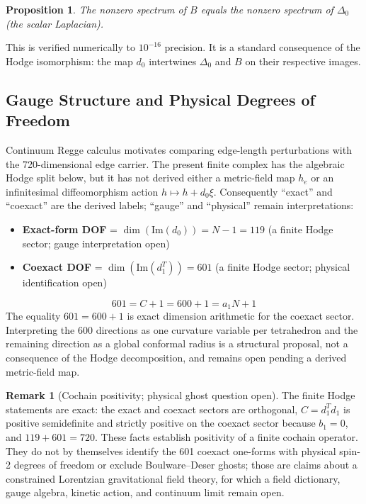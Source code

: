 \documentclass[12pt,a4paper]{article}
\newtheorem{proposition}{Proposition}
\theoremstyle{definition}
\newtheorem{remark}{Remark}
\begin{document}
\begin{proposition}
The nonzero spectrum of $B$ equals the nonzero spectrum of $\Delta_0$ (the scalar Laplacian).
\end{proposition}

This is verified numerically to $10^{-16}$ precision. It is a standard consequence of the Hodge isomorphism: the map $d_0$ intertwines $\Delta_0$ and $B$ on their respective images.

\subsection{Gauge Structure and Physical Degrees of Freedom}

Continuum Regge calculus motivates comparing edge-length perturbations with the 720-dimensional edge carrier.  The present finite complex has the algebraic Hodge split below, but it has not derived either a metric-field map $h_e$ or an infinitesimal diffeomorphism action $h\mapsto h+d_0\xi$.  Consequently ``exact'' and ``coexact'' are the derived labels; ``gauge'' and ``physical'' remain interpretations:
\begin{itemize}
\item \textbf{Exact-form DOF} = $\dim(\mathrm{Im}(d_0)) = N - 1 = 119$ (a finite Hodge sector; gauge interpretation open)
\item \textbf{Coexact DOF} = $\dim(\mathrm{Im}(d_1^T)) = 601$ (a finite Hodge sector; physical identification open)
\end{itemize}

\begin{equation}
\boxed{601 = C + 1 = 600 + 1 = a_1 N + 1}
\end{equation}
The equality $601=600+1$ is exact dimension arithmetic for the coexact sector.  Interpreting the 600 directions as one curvature variable per tetrahedron and the remaining direction as a global conformal radius is a structural proposal, not a consequence of the Hodge decomposition, and remains open pending a derived metric-field map.

\begin{remark}[Cochain positivity; physical ghost question open]
The finite Hodge statements are exact: the exact and coexact sectors are orthogonal, $C=d_1^T d_1$ is positive semidefinite and strictly positive on the coexact sector because $b_1=0$, and $119+601=720$.  These facts establish positivity of a finite cochain operator.  They do not by themselves identify the 601 coexact one-forms with physical spin-2 degrees of freedom or exclude Boulware--Deser ghosts; those are claims about a constrained Lorentzian gravitational field theory, for which a field dictionary, gauge algebra, kinetic action, and continuum limit remain open.
\end{remark}
\end{document}
